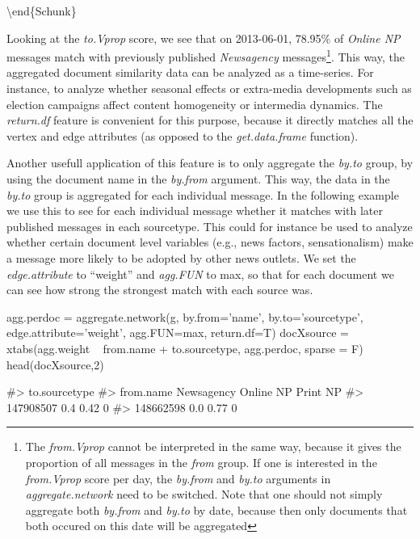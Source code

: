 \textbackslash{}end\{Schunk\}

Looking at the \emph{to.Vprop} score, we see that on 2013-06-01, 78.95\%
of \emph{Online NP} messages match with previously published
\emph{Newsagency}
messages\footnote{The \emph{from.Vprop} cannot be interpreted in the same way, because it gives the proportion of all messages in the \emph{from} group. If one is interested in the \emph{from.Vprop} score per day, the \emph{by.from} and \emph{by.to} arguments in \emph{aggregate.network} need to be switched. Note that one should not simply aggregate both \emph{by.from} and \emph{by.to} by date, because then only documents that both occured on this date will be aggregated}.
This way, the aggregated document similarity data can be analyzed as a
time-series. For instance, to analyze whether seasonal effects or
extra-media developments such as election campaigns affect content
homogeneity or intermedia dynamics. The \emph{return.df} feature is
convenient for this purpose, because it directly matches all the vertex
and edge attributes (as opposed to the \emph{get.data.frame} function).

Another usefull application of this feature is to only aggregate the
\emph{by.to} group, by using the document name in the \emph{by.from}
argument. This way, the data in the \emph{by.to} group is aggregated for
each individual message. In the following example we use this to see for
each individual message whether it matches with later published messages
in each sourcetype. This could for instance be used to analyze whether
certain document level variables (e.g., news factors, sensationalism)
make a message more likely to be adopted by other news outlets. We set
the \emph{edge.attribute} to ``weight'' and \emph{agg.FUN} to max, so
that for each document we can see how strong the strongest match with
each source was.

\begin{Schunk}
\begin{Sinput}
agg.perdoc = aggregate.network(g, by.from='name', by.to='sourcetype', 
                                  edge.attribute='weight', agg.FUN=max, 
                                  return.df=T)
docXsource = xtabs(agg.weight ~ from.name + to.sourcetype, agg.perdoc, sparse = F)
head(docXsource,2)
\end{Sinput}
\begin{Soutput}
#>            to.sourcetype
#> from.name   Newsagency Online NP Print NP
#>   147908507        0.4      0.42        0
#>   148662598        0.0      0.77        0
\end{Soutput}
\end{Schunk}

